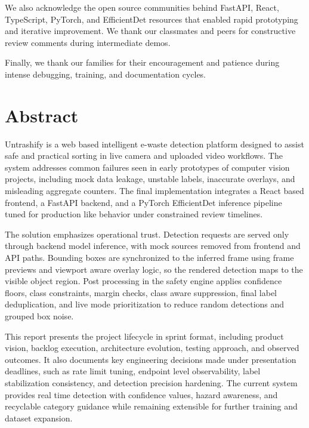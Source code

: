 \documentclass[12pt,a4paper]{report}
\begin{document}
We also acknowledge the open source communities behind FastAPI, React, TypeScript, PyTorch, and EfficientDet resources that enabled rapid prototyping and iterative improvement. We thank our classmates and peers for constructive review comments during intermediate demos.

Finally, we thank our families for their encouragement and patience during intense debugging, training, and documentation cycles.

\chapter*{Abstract}
Untrashify is a web based intelligent e-waste detection platform designed to assist safe and practical sorting in live camera and uploaded video workflows. The system addresses common failures seen in early prototypes of computer vision projects, including mock data leakage, unstable labels, inaccurate overlays, and misleading aggregate counters. The final implementation integrates a React based frontend, a FastAPI backend, and a PyTorch EfficientDet inference pipeline tuned for production like behavior under constrained review timelines.

The solution emphasizes operational trust. Detection requests are served only through backend model inference, with mock sources removed from frontend and API paths. Bounding boxes are synchronized to the inferred frame using frame previews and viewport aware overlay logic, so the rendered detection maps to the visible object region. Post processing in the safety engine applies confidence floors, class constraints, margin checks, class aware suppression, final label deduplication, and live mode prioritization to reduce random detections and grouped box noise.

This report presents the project lifecycle in sprint format, including product vision, backlog execution, architecture evolution, testing approach, and observed outcomes. It also documents key engineering decisions made under presentation deadlines, such as rate limit tuning, endpoint level observability, label stabilization consistency, and detection precision hardening. The current system provides real time detection with confidence values, hazard awareness, and recyclable category guidance while remaining extensible for further training and dataset expansion.
\end{document}
